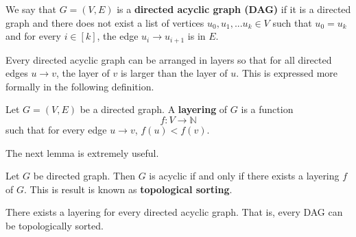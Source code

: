 \documentclass{article}
\begin{document}
  \begin{definition}
  We say that $G = (V, E)$ is a \textbf{directed acyclic graph (DAG)} if it is a directed graph and there does not exist a list of vertices $u_0, u_1, ... u_k \in V$ such that $u_0 = u_k$ and for every $i \in [k]$, the edge $u_i \rightarrow u_{i+1}$ is in $E$. 
  \end{definition}

  Every directed acyclic graph can be arranged in layers so that for all directed edges $u \rightarrow v$, the layer of $v$ is larger than the layer of $u$. This is expressed more formally in the following definition. 

  \begin{definition}
  Let $G = (V, E)$ be a directed graph. A \textbf{layering} of $G$ is a function 
  \[f: V \longrightarrow \mathbb{N}\]
  such that for every edge $u \rightarrow v$, $f(u) < f(v)$.
  \end{definition}

  The next lemma is extremely useful. 
  \begin{theorem}
  Let $G$ be directed graph. Then $G$ is acyclic if and only if there exists a layering $f$ of $G$. This is result is known as \textbf{topological sorting}. 
  \end{theorem}

  \begin{corollary}
  There exists a layering for every directed acyclic graph. That is, every DAG can be topologically sorted. 
  \end{corollary}
\end{document}
